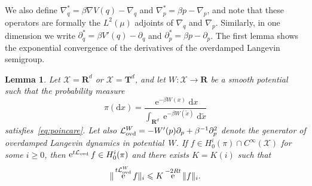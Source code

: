 \documentclass[11pt,a4paper]{article}
\DeclareMathOperator{\e}{e}
\newcommand{\real}{\mathbf R}
\newcommand{\torus}{\mathbf T}
\renewcommand{\d}{\mathrm d}
\theoremstyle{plain}
\newtheorem{lemma}{Lemma}[section]
\numberwithin{equation}{section}
\renewcommand{\leq}{\leqslant}
\renewcommand{\geq}{\geqslant}
\begin{document}
We also define $\nabla_q^* = \beta \nabla V(q) - \nabla_q$ and $\nabla_p^* = \beta p - \nabla_p$,
and note that these operators are formally the $L^2(\mu)$ adjoints of $\nabla_q$ and $\nabla_p$.
Similarly, in one dimension we write $\partial_q^* = \beta V'(q) - \partial_q$ and $\partial_p^* = \beta p - \partial_p$.
The first lemma shows the exponential convergence of the derivatives of the overdamped Langevin semigroup.
\begin{lemma}
    \label{lemma:overdamped_langevin_decay_derivatives}
    Let $\mathcal X = \real^d$ or $\mathcal X = \torus^d$,
    and let $W: \mathcal X \to \real$ be a smooth potential such that the probability measure
    \[
        \pi(\d x) = \frac{\e^{- \beta W(x)} \d x}{\int_{\real^d} \e^{-\beta W(\widetilde x)} \d \widetilde x}
    \]
    satisfies~\eqref{eq:poincare}.
    Let also $\mathcal L_{\rm ovd}^W = - W'(p) \partial_p + \beta^{-1} \partial_p^2$ denote the generator of overdamped Langevin dynamics in potential~$W$.
    If $f \in H^i_0(\pi) \cap C^{\infty}(\mathcal X)$ for some $i \geq 0$,
    then $\e^{t \mathcal L_{\rm ovd}} f \in H^i_0(\pi)$ and there exists $K = K(i)$ such that
    \[
        \norm*{\e^{t \mathcal L_{\rm ovd}^W} f}_i \leq K \e^{- 2 R t} \norm*{f}_i.
    \]
\end{lemma}
\end{document}
